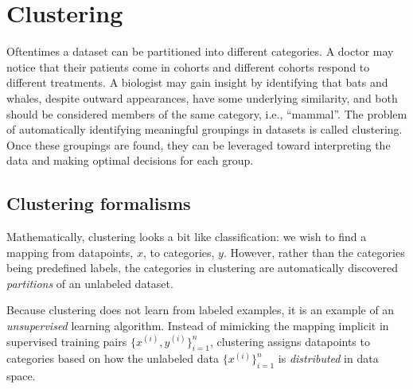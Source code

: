 \chapter{Clustering}
\label{chap-clustering}

Oftentimes a dataset can be partitioned into different categories. A
doctor may notice that their patients come in cohorts and different
cohorts respond to different treatments. A biologist may gain insight
by identifying that bats and whales, despite outward appearances,
have some underlying similarity, and both should be considered members
of the same category, i.e., ``mammal''. The problem of automatically
identifying meaningful groupings in datasets is called
clustering. Once these groupings are found, they can be leveraged
toward interpreting the data and making optimal decisions for each
group.

\section{Clustering formalisms}




Mathematically, clustering looks a bit like classification: we wish to
find a mapping from datapoints, $x$, to categories, $y$. However,
rather than the categories being predefined labels, the categories in
clustering are automatically discovered \textit{partitions} of an
unlabeled dataset.

Because clustering does not learn from labeled examples, it is an
example of an \textit{unsupervised} learning algorithm. Instead of
mimicking the mapping implicit in supervised training pairs
$\{x^{(i)},y^{(i)}\}_{i=1}^n$, clustering assigns datapoints to
categories based on how the unlabeled data $\{x^{(i)}\}_{i=1}^n$ is
\textit{distributed} in data space.



